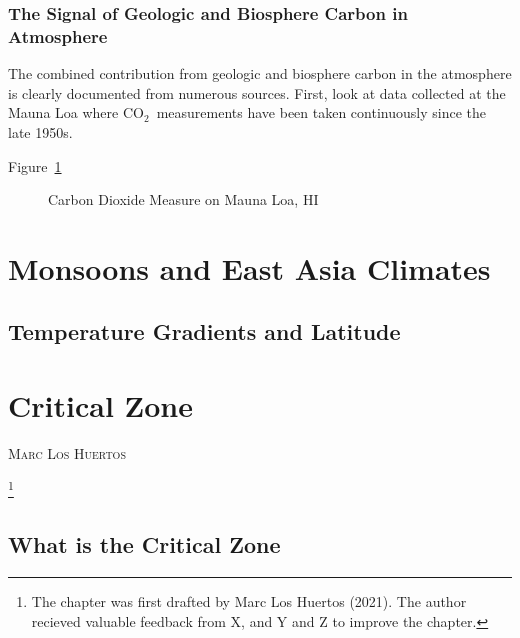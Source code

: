 \documentclass{book}\usepackage{knitr}
\makeatletter
\newcommand{\chapterauthor}[1]{%
  {\parindent0pt\vspace*{-25pt}%
  \linespread{1.1}\large\scshape#1%
  \par\nobreak\vspace*{35pt}}
  \@afterheading%
}
\newcommand{\carbondioxide}{CO$_2$~}
\makeatother
\begin{document}
\subsection{The Signal of Geologic and Biosphere Carbon in Atmosphere}

The combined contribution from geologic and biosphere carbon in the atmosphere is clearly documented from numerous sources. First, look at data collected at the Mauna Loa where \carbondioxide measurements have been taken continuously since the late 1950s. 

Figure~\ref{fig:maunaloa2}

\begin{figure}
\begin{knitrout}
\color{fgcolor}\begin{kframe}


{\ttfamily\noindent\bfseries\color{errorcolor}{\#\# Error in ggplot(train.data, aes(decimal.date, average)): object 'train.data' not found}}\end{kframe}
\end{knitrout}
\caption{Carbon Dioxide Measure on Mauna Loa, HI}
\label{fig:maunaloa2}
\end{figure}






\chapter{Monsoons and East Asia Climates}

\section{Temperature Gradients and Latitude}





\chapter{Critical Zone}\label{ch:critical-zone}

\chapterauthor{Marc Los Huertos}\footnote{The chapter was first drafted by Marc Los Huertos (2021). The author recieved valuable feedback from X, and Y and Z to improve the chapter.}

\section{What is the Critical Zone}
\end{document}
